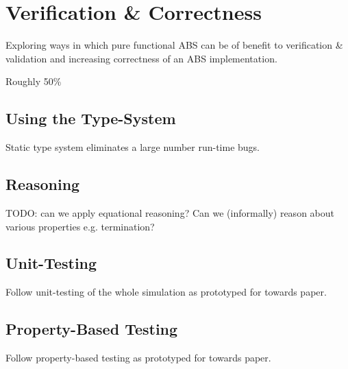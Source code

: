 \chapter{Verification \& Correctness}
Exploring ways in which pure functional ABS can be of benefit to verification \& validation and increasing correctness of an ABS implementation. 

Roughly 50\%

\section{Using the Type-System}
Static type system eliminates a large number run-time bugs.

\section{Reasoning}
TODO: can we apply equational reasoning? Can we (informally) reason about various properties e.g. termination?

\section{Unit-Testing}
Follow unit-testing of the whole simulation as prototyped for towards paper.

\section{Property-Based Testing}
Follow property-based testing as prototyped for towards paper.